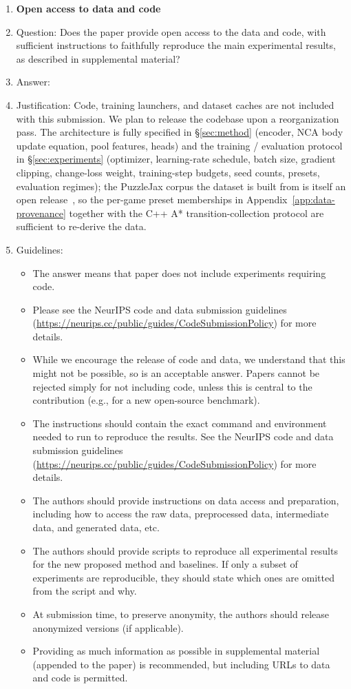 \begin{enumerate}
\item {\bf Open access to data and code}
    \item[] Question: Does the paper provide open access to the data and code, with sufficient instructions to faithfully reproduce the main experimental results, as described in supplemental material?
    \item[] Answer: \answerNo{}
    \item[] Justification: Code, training launchers, and dataset caches are not included with this submission. We plan to release the codebase upon a reorganization pass. The architecture is fully specified in \S\ref{sec:method} (encoder, NCA body update equation, pool features, heads) and the training / evaluation protocol in \S\ref{sec:experiments} (optimizer, learning-rate schedule, batch size, gradient clipping, change-loss weight, training-step budgets, seed counts, presets, evaluation regimes); the PuzzleJax corpus the dataset is built from is itself an open release~\cite{earle2025puzzlejax}, so the per-game preset memberships in Appendix~\ref{app:data-provenance} together with the C++ A* transition-collection protocol are sufficient to re-derive the data.
    \item[] Guidelines:
    \begin{itemize}
        \item The answer \answerNA{} means that paper does not include experiments requiring code.
        \item Please see the NeurIPS code and data submission guidelines (\url{https://neurips.cc/public/guides/CodeSubmissionPolicy}) for more details.
        \item While we encourage the release of code and data, we understand that this might not be possible, so \answerNo{} is an acceptable answer. Papers cannot be rejected simply for not including code, unless this is central to the contribution (e.g., for a new open-source benchmark).
        \item The instructions should contain the exact command and environment needed to run to reproduce the results. See the NeurIPS code and data submission guidelines (\url{https://neurips.cc/public/guides/CodeSubmissionPolicy}) for more details.
        \item The authors should provide instructions on data access and preparation, including how to access the raw data, preprocessed data, intermediate data, and generated data, etc.
        \item The authors should provide scripts to reproduce all experimental results for the new proposed method and baselines. If only a subset of experiments are reproducible, they should state which ones are omitted from the script and why.
        \item At submission time, to preserve anonymity, the authors should release anonymized versions (if applicable).
        \item Providing as much information as possible in supplemental material (appended to the paper) is recommended, but including URLs to data and code is permitted.
    \end{itemize}



\end{enumerate}
